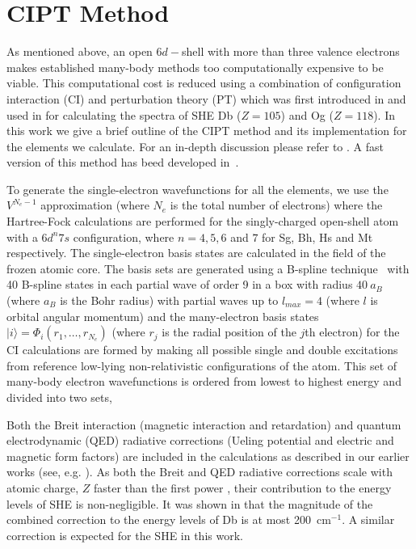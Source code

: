 \documentclass[8pt,a4paper, twoside]{report}
\begin{document}
\section{CIPT Method} \label{sec:CIPT}

As mentioned above, an open $6d-$shell with more than three  valence electrons makes established many-body methods too computationally expensive to be viable. This computational cost is reduced using a combination of configuration interaction (CI) and perturbation theory (PT) which was first introduced in \cite{DBHF2017} and used in \cite{LDFDb2018, LDF118} for calculating the spectra of SHE Db ($Z=105$) and Og ($Z=118$). In this work we give a brief outline of the CIPT method and its implementation for the elements we calculate. For an in-depth discussion please refer to \cite{DBHF2017}. A fast version of this method has beed developed in~\cite{FCI}.

To generate the single-electron wavefunctions for all the elements,  we use the $V^{N_e-1}$ approximation (where $N_e$ is the total number of electrons) \cite{Kelly1964, Dzuba2005} where the Hartree-Fock calculations are performed for the singly-charged open-shell atom with a   $6d^n7s$ configuration, where $n=4,5,6$ and $7$ for Sg, Bh, Hs and Mt respectively. The  single-electron basis states are calculated in the field of the frozen atomic core. The basis sets are generated using a  B-spline technique~\cite{Johnson1988}  with 40 B-spline states in each partial wave of order 9 in a box with radius $40 \ a_B$ (where $a_B$ is the Bohr radius) with partial waves up to $l_{max}=4$ (where $l$ is orbital angular momentum) and the many-electron basis states $|i \rangle = \Phi_i(r_1,\dots,r_{N_e})$ (where $r_j$ is the radial position of the $j$th electron)  for the CI calculations are formed by making all possible single and double excitations from reference low-lying non-relativistic configurations of the atom. This set of many-body electron wavefunctions is ordered from lowest to highest energy and divided into two sets, 


Both the Breit interaction (magnetic interaction and retardation)\cite{Breit1929, Mann1971}  and quantum electrodynamic (QED) radiative corrections  (Ueling potential and electric and magnetic form factors) \cite{FG2005} are included in the calculations as described in our earlier works (see, e.g. \cite{FF113-115}).  As both the Breit and QED radiative corrections scale with atomic charge, $Z$ faster than the first power \cite{FF113-115}, their contribution to the energy levels of SHE is non-negligible. It was shown in \cite{LDFDb2018} that the magnitude of the combined correction to the energy levels of Db is at most  200~cm$^{-1}$.  A similar correction is expected for the SHE in this work.
\end{document}
